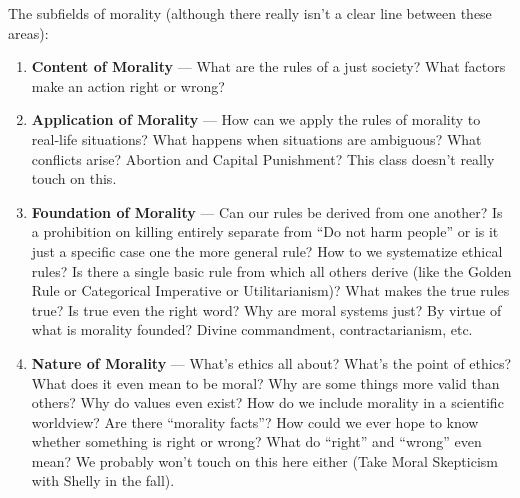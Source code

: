 The subfields of morality (although there really isn't a clear line between these areas):

\begin{enumerate}
	\item \textbf{Content of Morality} --- What are the rules of a just society? What factors make an action right or wrong? 
	\item \textbf{Application of Morality} --- How can we apply the rules of morality to real-life situations? What happens when situations are ambiguous? What conflicts arise? Abortion and Capital Punishment? This class doesn't really touch on this.
	\item \textbf{Foundation of Morality} --- Can our rules be derived from one another? Is a prohibition on killing entirely separate from ``Do not harm people'' or is it just a specific case one the more general rule? How to we systematize ethical rules? Is there a single basic rule from which all others derive (like the Golden Rule or Categorical Imperative or Utilitarianism)? What makes the true rules true? Is true even the right word? Why are moral systems just? By virtue of what is morality founded? Divine commandment, contractarianism, etc.
	\item \textbf{Nature of Morality} --- What's ethics all about? What's the point of ethics? What does it even mean to be moral? Why are some things more valid than others? Why do values even exist? How do we include morality in a scientific worldview? Are there ``morality facts''? How could we ever hope to know whether something is right or wrong? What do ``right'' and ``wrong'' even mean? We probably won't touch on this here either (Take Moral Skepticism with Shelly in the fall).
\end{enumerate}
